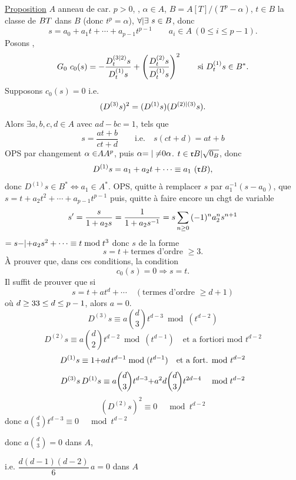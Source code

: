 \uline{Proposition}  $A$ anneau de car. $p>0$, , $\alpha\in A$, $B=A[T]/(T^p-\alpha)$, $t\in B$ la classe de ${B}T$ dans $B$ (donc $t^p=\alpha$), ${\forall|\exists}\ s\in B$, donc
\[
s=a_0+a_1t+\cdots+a_{p-1}t^{p-1}\qquad a_i\in A\ (0\le i\le p-1).
\]
Posons
,
\[
\deleted{\unsure{G_0}}\ c_0(s)=-\frac{D_t^{(\unsure{3|2})}s}{D_t^{(1)}s}+\left(\frac{D_t^{(2)}s}{D_t^{(1)}s}\right)^2\qquad\text{si }D_t^{(1)}s\in B^*.
\]
Supposons $c_0(s)=0$ i.e.
\[
(D^{(3)}s)^2=(D^{(1)}s)(D^{{(2)|(3)}}s).
\]
Alors $\exists a,b,c,d\in A$  avec $ad-bc=1$, tels que
\[
s=\frac{at+b}{ct+d}\qquad\text{i.e.}\quad s(ct+d)=at+b
\]
OPS  par changement ${\alpha\in}{{A}}A^p$, puis $\alpha{=|\ne}0{{\alpha}}$.  $t\in{\mathfrak r B|\sqrt{0_B}}$, donc
\[
D^{(1)}s=a_1+a_2t+\cdots\equiv a_1\ (\unsure{\mathfrak r B}),
\]
donc $D^{(1)}s\in B^*\Longleftrightarrow a_1\in A^*$. OPS, quitte à remplacer $s$ par $a_1^{-1}(s-a_0)$, que $s=t+a_2t^2+\cdots+a_{p-1}t^{p-1}$ puis, quitte à faire encore un chgt de variable 
\[
s'=\frac{s}{1+a_2s}={{\frac1{1+a_2s^{-1}}}}={{s}}\sum_{n\ge0}{(-1)^n}a_2^n s^{n+1}
\]
$=s{-|+}a_2s^2+\cdots\equiv t\bmod t^3$ donc $s$ de la forme
\[
s=t+\text{termes d'ordre }\ge3.
\]
 À prouver que, dans ces conditions, la condition
\[
c_0(s)=0\Longrightarrow s=t.
\]
 Il suffit de prouver que si
\[
s=t+at^d+\cdots\quad(\text{termes d'ordre }\ge d+1)
\]
où ${d\ge3}{3\le d\le p-1}$, alors $a=0$.
\[
D^{(3)}s\equiv a\binom d3t^{d-3}\bmod(t^{d-2})
\]
\[
D^{(2)}s\equiv a\binom d2t^{d-2}\bmod(t^{d-1})\quad\text{et a fortiori mod }t^{d-2}
\]
\[
D^{(1)}s\equiv1{+ad\,t^{d-1}}\bmod(t^{d-1})\quad\text{et a fort. mod }t^{d-2}
\]
\[
D^{(3)}s\,D^{(1)}s\equiv a\binom d3t^{d-3}{+a^2d\binom d3t^{2d-4}}\quad\bmod t^{d-2}
\]
\[
(D^{(2)}s)^2\equiv0\quad\bmod t^{d-2}
\]
donc $a\binom d3t^{d-3}\equiv0\quad\bmod t^{d-2}$

donc $a\binom d3=0$ dans $A$,

i.e. $\dfrac{d(d-1)(d-2)}6\,a=0$ dans $A$

